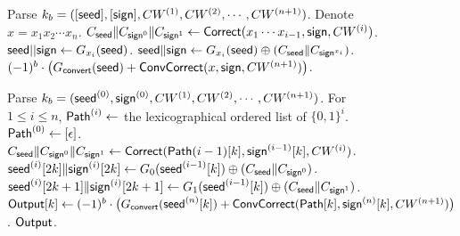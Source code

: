 \begin{figure*}
{{\begin{algorithmic}
    \State Parse $k_b = ([{\sf seed}],[{\sf sign}],CW^{(1)},CW^{(2)},\cdots,CW^{(n+1)})$. 
    \State Denote $x=x_1x_2\cdots x_n$. 
      \State $C_{\sf seed}\|C_{{\sf sign}^0}\|C_{{\sf sign}^1}\gets {\sf Correct}(x_1\cdots x_{i-1},{\sf sign},CW^{(i)})$.
      \State ${\sf seed}||{\sf sign}\gets G_{x_i}({\sf seed})$. 
      \State ${\sf seed}\|{\sf sign}\gets G_{x_i}({\sf seed})\oplus(C_{{\sf seed}}\|C_{{\sf sign}^{x_i}})$. 
    \EndFor
    \State \Return $(-1)^b\cdot \big(G_{\sf convert}({\sf seed})+{\sf ConvCorrect}(x,{\sf sign},CW^{(n+1)})\big)$. 
    \EndProcedure
    \item[]
    \State Parse $k_b=({\sf seed}^{(0)},{\sf sign}^{(0)},CW^{(1)},CW^{(2)},\cdots,CW^{(n+1)})$. 
    \State For $1\le i\le n$, ${\sf Path}^{(i)}\gets$ the lexicographical ordered list of $\{0,1\}^i$. ${\sf Path}^{(0)}\gets[\epsilon]$. 
        \State $C_{\sf seed}\|C_{{\sf sign}^0}\|C_{{\sf sign}^1}\gets {\sf Correct}({\sf Path}{(i-1)}[k],{\sf sign}^{(i-1)}[k],CW^{(i)})$.
        \State ${\sf seed}^{(i)}[2k]\|{\sf sign}^{(i)}[2k]\gets G_0({\sf seed}^{(i-1)}[k])\oplus (C_{\sf seed}\|C_{{\sf sign}^0})$.
        \State ${\sf seed}^{(i)}[2k+1]\|{\sf sign}^{(i)}[2k+1]\gets G_1({\sf seed}^{(i-1)}[k])\oplus (C_{\sf seed}\|C_{{\sf sign}^1})$.
      \EndFor
    \EndFor
      \State ${\sf Output}[k]\gets (-1)^b\cdot \big(G_{\sf convert}({\sf seed}^{(n)}[k])+{\sf ConvCorrect}({\sf Path}[k],{\sf sign}^{(n)}[k],CW^{(n+1)})\big)$.
    \EndFor
    \State\Return $\sf Output$. 
    \EndProcedure
    \end{algorithmic}}}
\end{figure*}

\newpage
